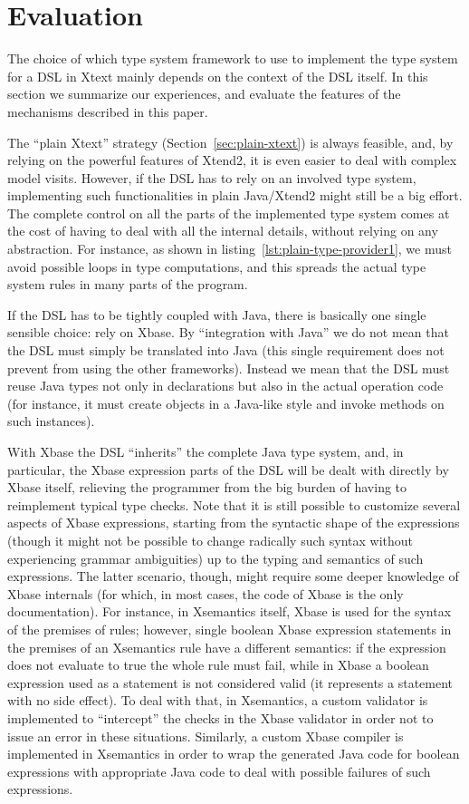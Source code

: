\section{Evaluation}
\label{sec:evaluation}

The choice of which type system framework to use to implement the type system
for a DSL in Xtext mainly depends on the context of the DSL itself.  In this
section we summarize our experiences, and evaluate the features of the
mechanisms described in this paper.

The ``plain Xtext'' strategy (Section~\ref{sec:plain-xtext}) is always feasible,
and, by relying on the powerful features of Xtend2, it is even easier to deal
with complex model visits.  However, if the DSL has to rely on an involved type
system, implementing such functionalities in plain Java/Xtend2 might still be a
big effort.  The complete control on all the parts of the implemented type
system comes at the cost of having to deal with all the internal details,
without relying on any abstraction.  For instance, as shown in
listing~\ref{lst:plain-type-provider1}, we must avoid possible loops in type
computations, and this spreads the actual type system rules in many parts of the
program.

If the DSL has to be tightly coupled with Java, there is basically one single
sensible choice: rely on Xbase.  By ``integration with Java'' we do not mean
that the DSL must simply be translated into Java (this single requirement does not
prevent from using the other frameworks).  Instead we mean that the DSL must
reuse Java types not only in declarations but also in the actual operation code
(for instance, it must create objects in a Java-like style and invoke methods on
such instances).

With Xbase the DSL ``inherits'' the complete Java type system, and, in
particular, the Xbase expression parts of the DSL will be dealt with directly by
Xbase itself, relieving the programmer from the big burden of having to
reimplement typical type checks.  Note that it is still possible to customize
several aspects of Xbase expressions, starting from the syntactic shape of the
expressions (though it might not be possible to change radically such syntax
without experiencing grammar ambiguities) up to the typing and semantics of such
expressions.  The latter scenario, though, might require some deeper knowledge
of Xbase internals (for which, in most cases, the code of Xbase is the only
documentation).  For instance, in Xsemantics itself, Xbase is used for the
syntax of the premises of rules; however, single boolean Xbase expression
statements in the premises of an Xsemantics rule have a different semantics: if
the expression does not evaluate to true the whole rule must fail, while in
Xbase a boolean expression used as a statement is not considered valid (it
represents a statement with no side effect).  To deal with that, in Xsemantics,
a custom validator is implemented to ``intercept'' the checks in the Xbase
validator in order not to issue an error in these situations.
Similarly, a custom Xbase compiler is implemented in Xsemantics in order to wrap
the generated Java code for boolean expressions with appropriate Java code to
deal with possible failures of such expressions.

